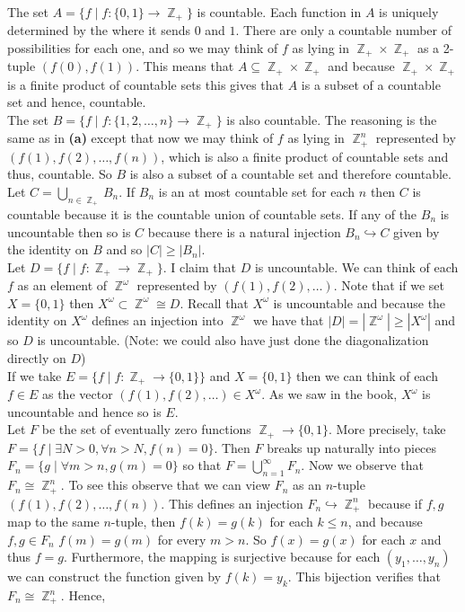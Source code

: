 \documentclass{article}
\DeclareMathOperator{\Z}{\mathbb{Z}}
\DeclareMathOperator{\into}{\hookrightarrow}
\newcommand{\problem}[1]{\noindent{\textbf{Problem #1}}\\}
\newcommand{\problempart}[1]{\noindent{\textbf{(#1)}}}
\begin{document}
\problem{1.7.5} 
\problempart{a} The set $A = \{f \mathrel{|} f: \{0,1\} \to \Z_+\}$ is countable. Each function in $A$ is uniquely determined by the where it sends $0$ and $1$. There are only a countable number of possibilities for each one, and so we may think of $f$ as lying in $\Z_+ \times \Z_+$ as a 2-tuple $(f(0), f(1))$. This means that $A \subseteq \Z_+ \times \Z_+$ and because $\Z_+ \times \Z_+$ is a finite product of countable sets this gives that $A$ is a subset of a countable set and hence, countable. \\
\problempart{b} The set $B = \{f \mathrel{|} f: \{1,2,\ldots, n\} \to \Z_+\}$ is also countable. The reasoning is the same as in {\bf (a)} except that now we may think of $f$ as lying in $\Z_+^n$ represented by $(f(1), f(2), \ldots, f(n))$, which is also a finite product of countable sets and thus, countable. So $B$ is also a subset of a countable set and therefore countable. \\
\problempart{c} Let $C = \bigcup_{n\in \Z_+} B_n$. If $B_n$ is an at most countable set for each $n$ then $C$ is countable because it is the countable union of countable sets. If any of the $B_n$ is uncountable then so is $C$ because there is a natural injection $B_n \hookrightarrow C$ given by the identity on $B$ and so $|C| \geq |B_n|$.  \\
\problempart{d} Let $D = \{f \mathrel{|} f: \Z_+ \to \Z_+\}$. I claim that $D$ is uncountable. We can think of each $f$ as an element of $\Z^\omega$ represented by $(f(1), f(2), \ldots)$. Note that if we set $X = \{0,1\}$ then $X^\omega \subset \Z^\omega \cong D$. Recall that $X^\omega$ is uncountable and because the identity on $X^\omega$ defines an injection into $\Z^\omega$ we have that $|D| = |\Z^\omega| \geq |X^\omega|$ and so $D$ is uncountable. (Note: we could also have just done the diagonalization directly on $D$)\\
\problempart{e} If we take $E = \{f \mathrel{|} f:\Z_+ \to \{0,1\}\}$ and $X = \{0,1\}$ then we can think of each $f \in E$ as the vector $(f(1), f(2), \ldots) \in X^\omega$. As we saw in the book, $X^\omega$ is uncountable and hence so is $E$. \\
\problempart{f} Let $F$ be the set of eventually zero functions $\Z_+ \to \{0,1\}$. More precisely, take $F = \{f \mathrel{|} \exists N > 0, \forall n>N, f(n) = 0\}$. Then $F$ breaks up naturally into pieces $F_n = \{g\mathrel{|} \forall m > n, g(m) = 0\}$ so that $F = \bigcup_{n = 1}^\infty F_n$. Now we observe that $F_n \cong \Z_+^n$. To see this observe that we can view $F_n$ as an $n$-tuple $(f(1), f(2), \ldots, f(n))$. This defines an injection $F_n \into \Z_+^n$ because if $f,g$ map to the same $n$-tuple, then $f(k) = g(k)$ for each $k \leq n$, and because $f,g \in F_n$ $f(m) = g(m)$ for every $m > n$. So $f(x) = g(x)$ for each $x$ and thus $f = g$. Furthermore, the mapping is surjective because for each $(y_1,\ldots, y_n)$ we can construct the function given by $f(k) = y_k$. This bijection verifies that $F_n \cong \Z_+^n$. Hence, 
\end{document}
